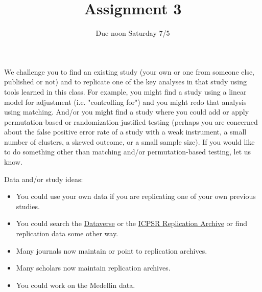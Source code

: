 \documentclass{article}
\title{Assignment 3}
\author{Due noon Saturday 7/5}
\begin{document}
\maketitle

We challenge you to find an existing study (your own or one from someone else,
published or not) and to replicate one of the key analyses in that study using
tools learned in this class. For example, you might find a study using a linear
model for adjustment (i.e. "controlling for") and you might redo that analysis
using matching. And/or you might find a study where you could add or apply
permutation-based or randomization-justified testing (perhaps you are concerned
about the false positive error rate of a study with a weak instrument, a small
number of clusters, a skewed outcome, or a small sample size). If you would like
to do something other than matching and/or permutation-based testing, let us
know.

Data and/or study ideas: \begin{itemize}
 \item You could use your own data if you are replicating one of your own
      previous studies.
 \item You could search the \href{http://dataverse.org/}{Dataverse} or the
  \href{https://www.icpsr.umich.edu/web/pages/ICPSR/index.html}{ICPSR
      Replication Archive} or find replication data some other way. 
 \item Many journals now maintain or point to replication archives.
 \item Many scholars now maintain replication archives.
 \item You could work on the Medellin data.
\end{itemize}
\end{document}
